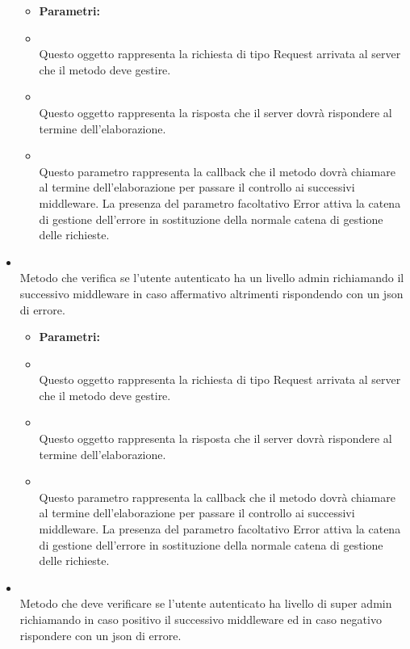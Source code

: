 \begin{itemize}
\begin{itemize}
						\item[] \textbf{Parametri:}
						\item[]  \\ Questo oggetto rappresenta la richiesta di tipo Request arrivata al server che il metodo deve gestire.	
						\item[]  \\ Questo oggetto rappresenta la risposta che il server dovrà rispondere al termine dell'elaborazione.	
						\item[]  \\ Questo parametro rappresenta la callback che il metodo dovrà chiamare al termine dell'elaborazione per passare il controllo ai successivi middleware. La presenza del parametro facoltativo Error attiva la catena di gestione dell'errore in sostituzione della normale catena di gestione delle richieste.	
				\end{itemize}
					\item[] \textbf{} \\ Metodo che verifica se l'utente autenticato ha un livello admin richiamando il successivo middleware in caso affermativo altrimenti rispondendo con un json di errore.
						\begin{itemize}\addtolength{\itemsep}{-0.5\baselineskip}
						\item[] \textbf{Parametri:}
						\item[]  \\ Questo oggetto rappresenta la richiesta di tipo Request arrivata al server che il metodo deve gestire.	
						\item[]  \\ Questo oggetto rappresenta la risposta che il server dovrà rispondere al termine dell'elaborazione.	
						\item[]  \\ Questo parametro rappresenta la callback che il metodo dovrà chiamare al termine dell'elaborazione per passare il controllo ai successivi middleware. La presenza del parametro facoltativo Error attiva la catena di gestione dell'errore in sostituzione della normale catena di gestione delle richieste.	
				\end{itemize}
					\item[] \textbf{} \\ Metodo che deve verificare se l'utente autenticato ha livello di super admin richiamando in caso positivo il successivo middleware ed in caso negativo rispondere con un json di errore.

\end{itemize}
